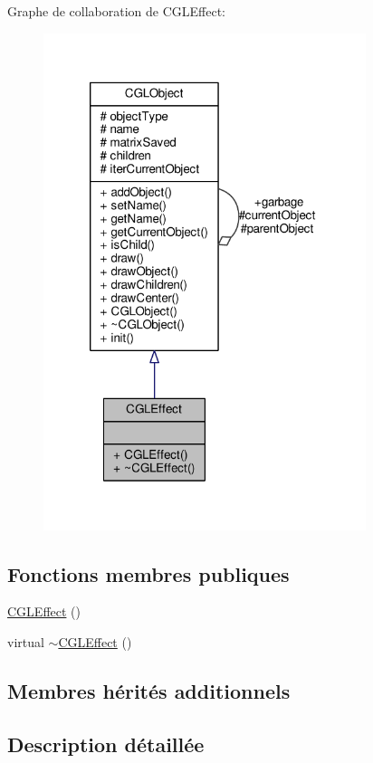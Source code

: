 Graphe de collaboration de C\-G\-L\-Effect\-:\nopagebreak
\begin{figure}[H]
\begin{center}
\leavevmode
\includegraphics[width=267pt]{d2/d69/class_c_g_l_effect__coll__graph}
\end{center}
\end{figure}
\subsection*{Fonctions membres publiques}
\begin{DoxyCompactItemize}
\item 
\hyperlink{class_c_g_l_effect_ad84b35aafce8ab422f939e5e51d5dd61}{C\-G\-L\-Effect} ()
\item 
virtual \hyperlink{class_c_g_l_effect_ab4bd0b2135fe6b04ed448a2acb0df4cc}{$\sim$\-C\-G\-L\-Effect} ()
\end{DoxyCompactItemize}
\subsection*{Membres hérités additionnels}


\subsection{Description détaillée}



